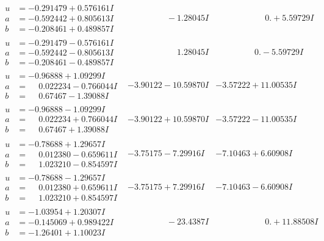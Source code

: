 \documentclass[1p]{elsarticle_modified}
\theoremstyle{definition}
\begin{document}
$$\begin{array}{c|c|c}
\begin{aligned}
u &= -0.291479 + 0.576161 I \\
a &= -0.592442 + 0.805613 I \\
b &= -0.208461 + 0.489857 I\end{aligned}
 & \phantom{-0.000000 } -1.28045 I & \phantom{-0.000000 -}0. + 5.59729 I \\ \hline\begin{aligned}
u &= -0.291479 - 0.576161 I \\
a &= -0.592442 - 0.805613 I \\
b &= -0.208461 - 0.489857 I\end{aligned}
 & \phantom{-0.000000 -}1.28045 I & \phantom{-0.000000 } 0. - 5.59729 I \\ \hline\begin{aligned}
u &= -0.96888 + 1.09299 I \\
a &= \phantom{-}0.022234 - 0.766044 I \\
b &= \phantom{-}0.67467 - 1.39088 I\end{aligned}
 & -3.90122 - 10.59870 I & -3.57222 + 11.00535 I \\ \hline\begin{aligned}
u &= -0.96888 - 1.09299 I \\
a &= \phantom{-}0.022234 + 0.766044 I \\
b &= \phantom{-}0.67467 + 1.39088 I\end{aligned}
 & -3.90122 + 10.59870 I & -3.57222 - 11.00535 I \\ \hline\begin{aligned}
u &= -0.78688 + 1.29657 I \\
a &= \phantom{-}0.012380 - 0.659611 I \\
b &= \phantom{-}1.023210 - 0.854597 I\end{aligned}
 & -3.75175 - 7.29916 I & -7.10463 + 6.60908 I \\ \hline\begin{aligned}
u &= -0.78688 - 1.29657 I \\
a &= \phantom{-}0.012380 + 0.659611 I \\
b &= \phantom{-}1.023210 + 0.854597 I\end{aligned}
 & -3.75175 + 7.29916 I & -7.10463 - 6.60908 I \\ \hline\begin{aligned}
u &= -1.03954 + 1.20307 I \\
a &= -0.145069 + 0.989422 I \\
b &= -1.26401 + 1.10023 I\end{aligned}
 & \phantom{-0.000000 } -23.4387 I & \phantom{-0.000000 -}0. + 11.88508 I \\ \hline\begin{aligned}

\end{aligned}
\end{array}$$
\end{document}
